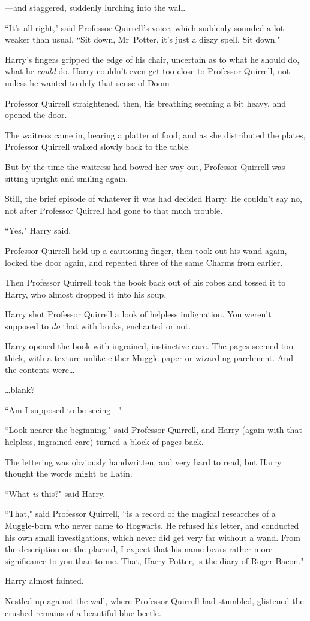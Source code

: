 —and staggered, suddenly lurching into the wall.

``It's all right," said Professor Quirrell's voice, which suddenly sounded a lot weaker than usual. ``Sit down, Mr~Potter, it's just a dizzy spell. Sit down."

Harry's fingers gripped the edge of his chair, uncertain as to what he should do, what he \emph{could} do. Harry couldn't even get too close to Professor Quirrell, not unless he wanted to defy that sense of Doom—

Professor Quirrell straightened, then, his breathing seeming a bit heavy, and opened the door.

The waitress came in, bearing a platter of food; and as she distributed the plates, Professor Quirrell walked slowly back to the table.

But by the time the waitress had bowed her way out, Professor Quirrell was sitting upright and smiling again.

Still, the brief episode of whatever it was had decided Harry. He couldn't say no, not after Professor Quirrell had gone to that much trouble.

``Yes," Harry said.

Professor Quirrell held up a cautioning finger, then took out his wand again, locked the door again, and repeated three of the same Charms from earlier.

Then Professor Quirrell took the book back out of his robes and tossed it to Harry, who almost dropped it into his soup.

Harry shot Professor Quirrell a look of helpless indignation. You weren't supposed to \emph{do} that with books, enchanted or not.

Harry opened the book with ingrained, instinctive care. The pages seemed too thick, with a texture unlike either Muggle paper or wizarding parchment. And the contents were{\ldots}

{\ldots}blank?

``Am I supposed to be seeing—"

``Look nearer the beginning," said Professor Quirrell, and Harry (again with that helpless, ingrained care) turned a block of pages back.

The lettering was obviously handwritten, and very hard to read, but Harry thought the words might be Latin.

``What \emph{is} this?" said Harry.

``That," said Professor Quirrell, ``is a record of the magical researches of a Muggle-born who never came to Hogwarts. He refused his letter, and conducted his own small investigations, which never did get very far without a wand. From the description on the placard, I expect that his name bears rather more significance to you than to me. That, Harry Potter, is the diary of Roger Bacon."

Harry almost fainted.

Nestled up against the wall, where Professor Quirrell had stumbled, glistened the crushed remains of a beautiful blue beetle.

